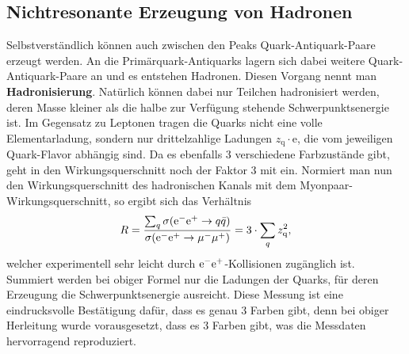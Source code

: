 \subsection{Nichtresonante Erzeugung von Hadronen}
Selbstverständlich können auch zwischen den Peaks Quark-Antiquark-Paare erzeugt werden.
An die Primärquark-Antiquarks lagern sich dabei weitere Quark-Antiquark-Paare an und es entstehen Hadronen.
Diesen Vorgang nennt man \textbf{Hadronisierung}.
Natürlich können dabei nur Teilchen hadronisiert werden, deren Masse kleiner als die halbe zur Verfügung stehende Schwerpunktsenergie ist.
Im Gegensatz zu Leptonen tragen die Quarks nicht eine volle Elementarladung, sondern nur drittelzahlige Ladungen $z_\text{q}\cdot\text{e}$, die vom jeweiligen Quark-Flavor abhängig sind.
Da es ebenfalls 3 verschiedene Farbzustände gibt, geht in den Wirkungsquerschnitt noch der Faktor 3 mit ein.
Normiert man nun den Wirkungsquerschnitt des hadronischen Kanals mit dem Myonpaar-Wirkungsquerschnitt, so ergibt sich das Verhältnis
\begin{equation*}
	R=\frac{\sum_q\sigma(\text{e}^-\text{e}^+\rightarrow q\bar{q})}{\sigma(\text{e}^-\text{e}^+\rightarrow\mu^-\mu^+)} = 3\cdot\sum_qz_\text{q}^2,
\end{equation*}
welcher experimentell sehr leicht durch $\text{e}^-\text{e}^+$-Kollisionen zugänglich ist.
Summiert werden bei obiger Formel nur die Ladungen der Quarks, für deren Erzeugung die Schwerpunktsenergie ausreicht.
Diese Messung ist eine eindrucksvolle Bestätigung dafür, dass es genau 3 Farben gibt, denn bei obiger Herleitung wurde vorausgesetzt, dass es 3 Farben gibt, was die Messdaten hervorragend reproduziert.
